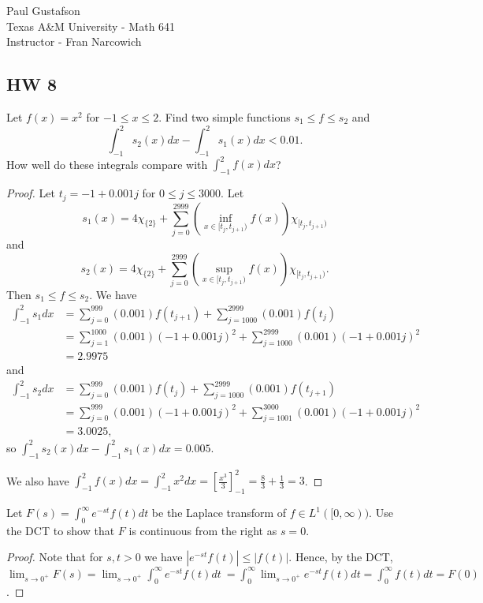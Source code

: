 \documentclass{article}
\begin{document}
\noindent Paul Gustafson\\
\noindent Texas A\&M University - Math 641\\ 
\noindent Instructor - Fran Narcowich

\subsection*{HW 8}
  Let $f(x) = x^2$ for $-1 \le x \le 2$. Find two simple functions $s_1 \le f \le s_2$ and
$$ \int_{-1}^2 s_2(x) dx - \int_{-1}^2 s_1(x) dx < 0.01.$$
How well do these integrals compare with $\int_{-1}^2 f(x)dx$?
\begin{proof}
Let $t_j = -1 + 0.001 j$ for $0 \le j \le 3000$. 
Let $$s_1(x) =  4\chi_{\{2\}} +  \sum_{j=0}^{2999} \left(\inf_{x \in [t_j, t_{j+1})} f(x) \right) \chi_{[t_j, t_{j+1})}$$ and
$$s_2(x) = 4\chi_{\{2\}} + \sum_{j=0}^{2999} \left(\sup_{x \in [t_j, t_{j+1})} f(x) \right) \chi_{[t_j, t_{j+1})}.$$
Then $s_1 \le f \le s_2$. We have
\begin{align*}
\int_{-1}^2 s_1 dx & = \sum_{j=0}^{999} (0.001)f(t_{j+1})  + \sum_{j=1000}^{2999} (0.001)f(t_{j}) 
\\ & = \sum_{j=1}^{1000} (0.001) (-1 + 0.001 j)^2  + \sum_{j=1000}^{2999} (0.001) (-1 + 0.001 j)^2
\\ &  = 2.9975
\end{align*}
and
\begin{align*}
\int_{-1}^2 s_2 dx & = \sum_{j=0}^{999} (0.001)f(t_{j})  + \sum_{j=1000}^{2999} (0.001)f(t_{j+1}) 
\\ & = \sum_{j=0}^{999} (0.001) (-1 + 0.001 j)^2  + \sum_{j=1001}^{3000} (0.001) (-1 + 0.001 j)^2
\\ &  = 3.0025,
\end{align*}
so $\int_{-1}^2 s_2(x) dx - \int_{-1}^2 s_1(x) dx = 0.005$.

We also have $\int_{-1}^2 f(x) dx = \int_{-1}^2 x^2 dx = \left[ \frac {x^3} 3 \right]_{-1}^2 = \frac 8 3 + \frac 1 3 = 3$.
\end{proof}


 Let $F(s) = \int_0^\infty e^{-st} f(t) dt$ be the Laplace transform of $f \in L^1([0,\infty))$. Use the DCT to show that $F$ is continuous from the right as $s = 0$.
\begin{proof}
Note that for $s,t > 0$ we have $|e^{-st}f(t)| \le |f(t)|$. Hence, by the DCT,
 $\lim_{s \to 0^+} F(s) = \lim_{s \to 0^+}  \int_0^\infty e^{-st} f(t) dt \ =  \int_0^\infty \lim_{s \to 0^+}  e^{-st} f(t) dt =  \int_0^\infty f(t) dt = F(0)$.
\end{proof}
\end{document}
